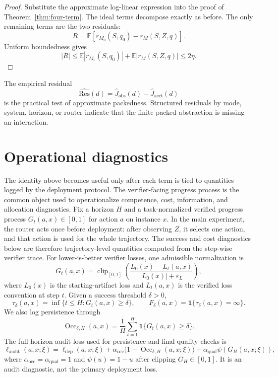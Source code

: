 \documentclass{article}
\DeclareMathOperator{\Occ}{Occ}
\newcommand{\E}{\mathbb{E}}
\newcommand{\eps}{\varepsilon}
\newcommand{\one}{\mathbf{1}}
\begin{document}
\begin{proof}
Substitute the approximate log-linear expression into the proof of
Theorem~\ref{thm:four-term}.  The ideal terms decompose exactly as before.  The only
remaining terms are the two residuals:
\[
    R=
    \E[r_{M_0}(S,q_0)-r_M(S,Z,q)].
\]
Uniform boundedness gives
\[
    |R|
    \le
    \E|r_{M_0}(S,q_0)|+\E|r_M(S,Z,q)|
    \le 2\eta.
\]
\end{proof}

The empirical residual
\[
    \widehat{\mathrm{Res}}(d)
    =
    \widehat J_{\mathrm{obs}}(d)-\widehat J_{\mathrm{acct}}(d)
\]
is the practical test of approximate packedness.  Structured residuals by mode, system,
horizon, or router indicate that the finite packed abstraction is missing an interaction.


\section{Operational diagnostics}
\label{subsec:bridge}

The identity above becomes useful only after each term is tied to quantities logged by the deployment protocol.
The verifier-facing progress process is the common object used to operationalize competence, cost, information, and allocation diagnostics.
Fix a horizon $H$ and a task-normalized verified progress process $G_t(a,x)\in[0,1]$ for action $a$ on instance $x$.
In the main experiment, the router acts once before deployment: after observing $Z$, it selects one action, and that action is used for the whole trajectory.
The success and cost diagnostics below are therefore trajectory-level quantities computed from the step-wise verifier trace.
For lower-is-better verifier losses, one admissible normalization is
\[
G_t(a,x)
=
\operatorname{clip}_{[0,1]}\!\left(
\frac{L_0(x)-L_t(a,x)}{|L_0(x)|+\eps_L}
\right),
\]
where $L_0(x)$ is the starting-artifact loss and $L_t(a,x)$ is the verified loss convention at step $t$.
Given a success threshold $\delta>0$,
\[
\tau_\delta(a,x)=\inf\{t\le H:G_t(a,x)\ge \delta\},
\qquad
F_\delta(a,x)=\one\{\tau_\delta(a,x)=\infty\}.
\]
We also log persistence through
\[
\Occ_{\delta,H}(a,x)=\frac{1}{H}\sum_{t=1}^H \one\{G_t(a,x)\ge \delta\}.
\]
The full-horizon audit loss used for persistence and final-quality checks is
\begin{equation}
\ell_{\mathrm{audit}}(a,x;\xi)
=
\ell_{\mathrm{dep}}(a,x;\xi)
+\alpha_{\mathrm{occ}}\bigl(1-\Occ_{\delta,H}(a,x;\xi)\bigr)
+\alpha_{\mathrm{qual}}\psi(G_H(a,x;\xi)),
\label{eq:audit-loss}
\end{equation}
where \(\alpha_{\mathrm{occ}}=\alpha_{\mathrm{qual}}=1\) and \(\psi(u)=1-u\) after clipping \(G_H\in[0,1]\).
It is an audit diagnostic, not the primary deployment loss.
\end{document}

